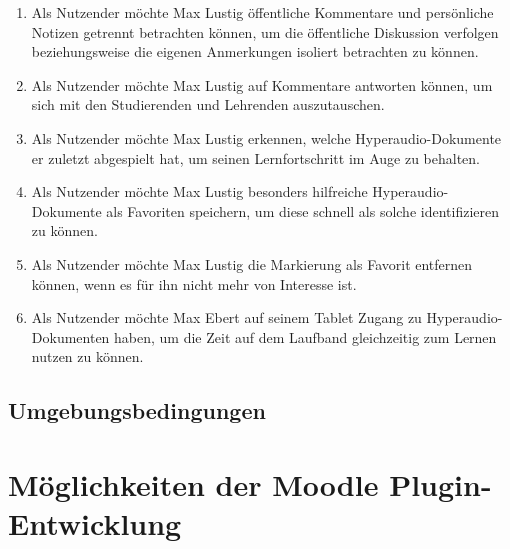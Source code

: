 \begin{enumerate}[label=US-\arabic*:,ref=US-\arabic*]
\item \label{US-Filter} Als Nutzender möchte Max Lustig öffentliche Kommentare und persönliche Notizen getrennt betrachten können, um die öffentliche Diskussion verfolgen beziehungsweise die eigenen Anmerkungen isoliert betrachten zu können.

\item \label{US-Antwort-S} Als Nutzender möchte Max Lustig auf Kommentare antworten können, um sich mit den Studierenden und Lehrenden auszutauschen.

\item \label{US-Uebersicht-Letzte} Als Nutzender möchte Max Lustig erkennen, welche Hyperaudio-Dokumente er zuletzt abgespielt hat, um seinen Lernfortschritt im Auge zu behalten.

\item \label{US-Favoriten} Als Nutzender möchte Max Lustig besonders hilfreiche Hyperaudio-Dokumente als Favoriten speichern, um diese schnell als solche identifizieren zu können.

\item \label{US-Favoriten-Loeschen} Als Nutzender möchte Max Lustig die Markierung als Favorit entfernen können, wenn es für ihn nicht mehr von Interesse ist.

\item \label{US-Zeit-Mobil} Als Nutzender möchte Max Ebert auf seinem Tablet Zugang zu Hyperaudio-Dokumenten haben, um die Zeit auf dem Laufband gleichzeitig zum Lernen nutzen zu können.

\end{enumerate}




\subsection{Umgebungsbedingungen}



\section{Möglichkeiten der Moodle Plugin-Entwicklung}


